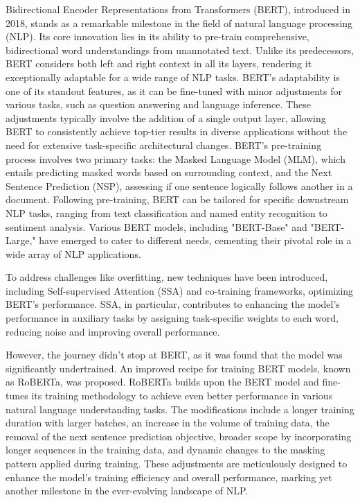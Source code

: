 \documentclass[conference]{IEEEtran}
\begin{document}
Bidirectional Encoder Representations from Transformers (BERT), introduced in 2018, stands as a remarkable milestone in the field of natural language processing (NLP). Its core innovation lies in its ability to pre-train comprehensive, bidirectional word understandings from unannotated text. Unlike its predecessors, BERT considers both left and right context in all its layers, rendering it exceptionally adaptable for a wide range of NLP tasks.
BERT's adaptability is one of its standout features, as it can be fine-tuned with minor adjustments for various tasks, such as question answering and language inference. These adjustments typically involve the addition of a single output layer, allowing BERT to consistently achieve top-tier results in diverse applications without the need for extensive task-specific architectural changes. BERT's pre-training process involves two primary tasks: the Masked Language Model (MLM), which entails predicting masked words based on surrounding context, and the Next Sentence Prediction (NSP), assessing if one sentence logically follows another in a document. Following pre-training, BERT can be tailored for specific downstream NLP tasks, ranging from text classification and named entity recognition to sentiment analysis. Various BERT models, including "BERT-Base" and "BERT-Large," have emerged to cater to different needs, cementing their pivotal role in a wide array of NLP applications.


To address challenges like overfitting, new techniques have been introduced, including Self-supervised Attention (SSA) and co-training frameworks, optimizing BERT's performance. SSA, in particular, contributes to enhancing the model's performance in auxiliary tasks by assigning task-specific weights to each word, reducing noise and improving overall performance.


However, the journey didn't stop at BERT, as it was found that the model was significantly undertrained. An improved recipe for training BERT models, known as RoBERTa, was proposed. RoBERTa builds upon the BERT model and fine-tunes its training methodology to achieve even better performance in various natural language understanding tasks. The modifications include a longer training duration with larger batches, an increase in the volume of training data, the removal of the next sentence prediction objective, broader scope by incorporating longer sequences in the training data, and dynamic changes to the masking pattern applied during training. These adjustments are meticulously designed to enhance the model's training efficiency and overall performance, marking yet another milestone in the ever-evolving landscape of NLP.
\end{document}
